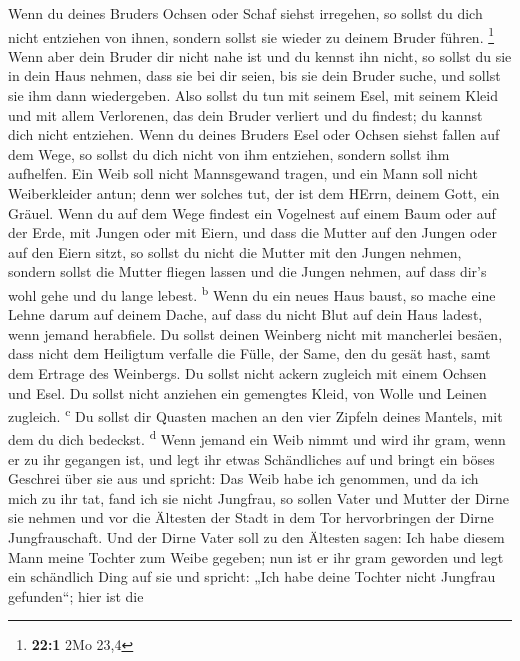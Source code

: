  Wenn du deines Bruders Ochsen oder Schaf siehst
irregehen, so sollst du dich nicht entziehen von ihnen, sondern sollst
sie wieder zu deinem Bruder führen. \footnote{\textbf{22:1} 2Mo 23,4}
 Wenn aber dein Bruder dir nicht nahe ist und du kennst
ihn nicht, so sollst du sie in dein Haus nehmen, dass sie bei dir seien,
bis sie dein Bruder suche, und sollst sie ihm dann wiedergeben.
 Also sollst du tun mit seinem Esel, mit seinem Kleid und
mit allem Verlorenen, das dein Bruder verliert und du findest; du kannst
dich nicht entziehen.  Wenn du deines Bruders Esel oder
Ochsen siehst fallen auf dem Wege, so sollst du dich nicht von ihm
entziehen, sondern sollst ihm aufhelfen.  Ein Weib soll
nicht Mannsgewand tragen, und ein Mann soll nicht Weiberkleider antun;
denn wer solches tut, der ist dem HErrn, deinem Gott, ein Gräuel.
 Wenn du auf dem Wege findest ein Vogelnest auf einem Baum
oder auf der Erde, mit Jungen oder mit Eiern, und dass die Mutter auf
den Jungen oder auf den Eiern sitzt, so sollst du nicht die Mutter mit
den Jungen nehmen,  sondern sollst die Mutter fliegen
lassen und die Jungen nehmen, auf dass dir's wohl gehe und du lange
lebest. \textsuperscript{b}  Wenn du ein neues Haus baust,
so mache eine Lehne darum auf deinem Dache, auf dass du nicht Blut auf
dein Haus ladest, wenn jemand herabfiele.  Du sollst
deinen Weinberg nicht mit mancherlei besäen, dass nicht dem Heiligtum
verfalle die Fülle, der Same, den du gesät hast, samt dem Ertrage des
Weinbergs.  Du sollst nicht ackern zugleich mit einem
Ochsen und Esel.  Du sollst nicht anziehen ein gemengtes
Kleid, von Wolle und Leinen zugleich. \textsuperscript{c}
 Du sollst dir Quasten machen an den vier Zipfeln deines
Mantels, mit dem du dich bedeckst. \textsuperscript{d} 
Wenn jemand ein Weib nimmt und wird ihr gram, wenn er zu ihr gegangen
ist,  und legt ihr etwas Schändliches auf und bringt ein
böses Geschrei über sie aus und spricht: Das Weib habe ich genommen, und
da ich mich zu ihr tat, fand ich sie nicht Jungfrau,  so
sollen Vater und Mutter der Dirne sie nehmen und vor die Ältesten der
Stadt in dem Tor hervorbringen der Dirne Jungfrauschaft. 
Und der Dirne Vater soll zu den Ältesten sagen: Ich habe diesem Mann
meine Tochter zum Weibe gegeben; nun ist er ihr gram geworden
 und legt ein schändlich Ding auf sie und spricht: „Ich
habe deine Tochter nicht Jungfrau gefunden``; hier ist die
